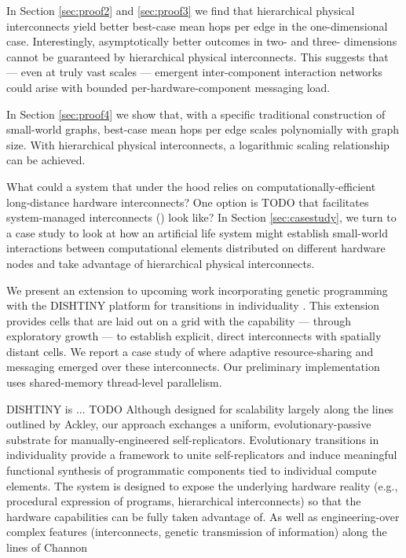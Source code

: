 In Section \ref{sec:proof2} and \ref{sec:proof3} we find that hierarchical physical interconnects yield better best-case mean hops per edge in the one-dimensional case.
Interestingly, asymptotically better outcomes in two- and three- dimensions cannot be guaranteed by hierarchical physical interconnects.
This suggests that --- even at truly vast scales --- emergent inter-component interaction networks could arise with bounded per-hardware-component messaging load.

In Section \ref{sec:proof4} we show that, with a specific traditional construction of small-world graphs, best-case mean hops per edge scales polynomially with graph size.
With hierarchical physical interconnects, a logarithmic scaling relationship can be achieved.

What could a system that under the hood relies on computationally-efficient long-distance hardware interconnects?
One option is TODO that facilitates system-managed interconnects () look like?
In Section \ref{sec:casestudy}, we turn to a case study to look at how an artificial life system might establish small-world interactions between computational elements distributed on different hardware nodes and take advantage of hierarchical physical interconnects.

We present an extension to upcoming work incorporating genetic programming with the DISHTINY platform for transitions in individuality \citep{moreno2019toward}.
This extension provides cells that are laid out on a grid with the capability --- through exploratory growth --- to establish explicit, direct interconnects with spatially distant cells.
We report a case study of where adaptive resource-sharing and messaging emerged over these interconnects.
Our preliminary implementation uses shared-memory thread-level parallelism.

DISHTINY is ... TODO
Although designed for scalability largely along the lines outlined by Ackley, our approach exchanges a uniform, evolutionary-passive substrate for manually-engineered self-replicators.
Evolutionary transitions in individuality provide a framework to unite self-replicators and induce meaningful functional synthesis of programmatic components tied to individual compute elements.
The system is designed to expose the underlying hardware reality (e.g., procedural expression of programs, hierarchical interconnects) so that the hardware capabilities can be fully taken advantage of.
As well as engineering-over complex features (interconnects, genetic transmission of information) along the lines of Channon


